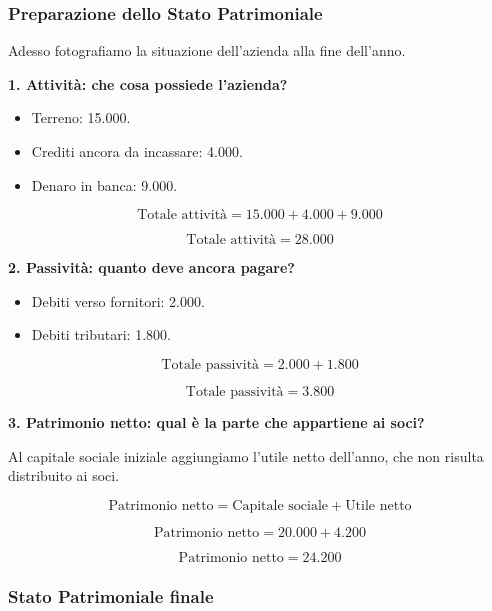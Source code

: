 \subsubsection*{Preparazione dello Stato Patrimoniale}

\noindent Adesso fotografiamo la situazione
dell'azienda alla fine dell'anno.

\medskip

\noindent \textbf{1. Attività: che cosa possiede l'azienda?}

\begin{itemize}
    \item Terreno: 15.000.
    \item Crediti ancora da incassare: 4.000.
    \item Denaro in banca: 9.000.
\end{itemize}

\[
\text{Totale attività}=15.000+4.000+9.000
\]

\[
\boxed{\text{Totale attività}=28.000}
\]

\medskip

\noindent \textbf{2. Passività: quanto deve ancora pagare?}

\begin{itemize}
    \item Debiti verso fornitori: 2.000.
    \item Debiti tributari: 1.800.
\end{itemize}

\[
\text{Totale passività}=2.000+1.800
\]

\[
\boxed{\text{Totale passività}=3.800}
\]

\medskip

\noindent \textbf{3. Patrimonio netto: qual è la parte
che appartiene ai soci?}

\noindent Al capitale sociale iniziale
aggiungiamo l'utile netto dell'anno,
che non risulta distribuito ai soci.

\[
\boxed{
\text{Patrimonio netto}
=
\text{Capitale sociale}+\text{Utile netto}
}
\]

\[
\text{Patrimonio netto}=20.000+4.200
\]

\[
\boxed{\text{Patrimonio netto}=24.200}
\]

\subsubsection*{Stato Patrimoniale finale}

